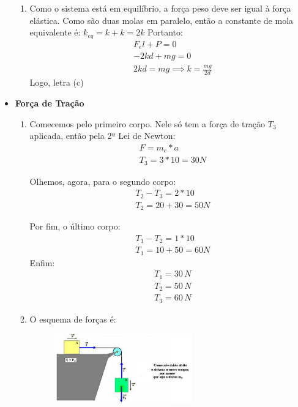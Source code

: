 \documentclass[12pt,letterpaper,fleqn]{article}
\begin{document}
\begin{itemize}
\begin{enumerate}
    \item Como o sistema está em equilíbrio, a força peso deve ser igual à força elástica. Como são duas molas em paralelo, então a constante de mola equivalente é: $k_{eq} = k+k = 2k$ Portanto:
    \begin{align*}
        &F_el + P =0 \\
        &-2kd + mg =0 \\
        & 2kd =mg \implies k = \frac{mg}{2d}
    \end{align*}
    Logo, letra (c)
\end{enumerate}

\item \textbf{Força de Tração}

\begin{enumerate}
    \item Comecemos pelo primeiro corpo. Nele só tem a força de tração $T_3$ aplicada, então pela 2ª Lei de Newton:
    \begin{align*}
        &F = m_c*a \\
        &T_3 = 3*10 = 30 N
    \end{align*}
    
    Olhemos, agora, para o segundo corpo:
    \begin{align*}
        &T_2 - T_3 = 2*10 \\
        & T_2 = 20 + 30 = 50 N
    \end{align*}
    
    Por fim, o último corpo:
    \begin{align*}
        &T_1 - T_2 = 1*10 \\
        &T_1 = 10+ 50 = 60 N
    \end{align*}
    Enfim:
    \begin{equation*}
        \boxed{\begin{split}
            &T_1 = 30\, N\\
            &T_2 = 50\, N\\
            &T_3 = 60\, N
        \end{split}}
    \end{equation*}
    
    \item \begin{enumerate}
    O esquema de forças é:
    \begin{figure}[h]
        \centering
        \includegraphics[width=0.6\textwidth]{resolucao_9.jpg}
    \end{figure}
    

\end{enumerate}
\end{enumerate}
\end{itemize}
\end{document}

